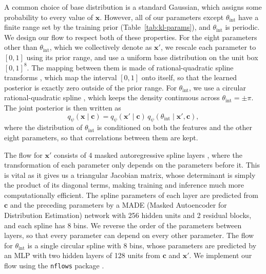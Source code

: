 A common choice of base distribution is a standard Gaussian, which assigns some probability to every value of $\mathbf{x}$. However, all of our parameters except $\theta_\mathrm{int}$ have a finite range set by the training prior (Table~\ref{tab:kl-params}), and $\theta_\mathrm{int}$ is periodic. We design our flow to respect both of these properties. For the eight parameters other than $\theta_\mathrm{int}$, which we collectively denote as $\mathbf{x}'$, we rescale each parameter to $[0, 1]$ using its prior range, and use a uniform base distribution on the unit box $[0, 1]^8$. The mapping between them is made of rational-quadratic spline transforms \citep{NeuralSplineFlows}, which map the interval $[0,1]$ onto itself, so that the learned posterior is exactly zero outside of the prior range. For $\theta_\mathrm{int}$, we use a circular rational-quadratic spline \citep{FlowsToriSpheres}, which keeps the density continuous across $\theta_\mathrm{int}=\pm\pi$. The joint posterior is then written as
\begin{equation}
\label{eqn:flow-factorization}
    q_\psi(\mathbf{x} \mid \mathbf{c}) = q_\psi(\mathbf{x}' \mid \mathbf{c})\, q_\psi(\theta_\mathrm{int} \mid \mathbf{x}', \mathbf{c}),
\end{equation}
where the distribution of $\theta_\mathrm{int}$ is conditioned on both the features and the other eight parameters, so that correlations between them are kept.

The flow for $\mathbf{x}'$ consists of 4 masked autoregressive spline layers \citep{MAF, NeuralSplineFlows}, where the transformation of each parameter only depends on the parameters before it. This is vital as it gives us a triangular Jacobian matrix, whose determinant is simply the product of its diagonal terms, making training and inference much more computationally efficient. The spline parameters of each layer are predicted from $\mathbf{c}$ and the preceding parameters by a MADE (Masked Autoencoder for Distribution Estimation) network \citep{MADE} with 256 hidden units and 2 residual blocks, and each spline has 8 bins. We reverse the order of the parameters between layers, so that every parameter can depend on every other parameter. The flow for $\theta_\mathrm{int}$ is a single circular spline with 8 bins, whose parameters are predicted by an MLP with two hidden layers of 128 units from $\mathbf{c}$ and $\mathbf{x}'$. We implement our flow using the \texttt{nflows} package \citep{nflows}.

